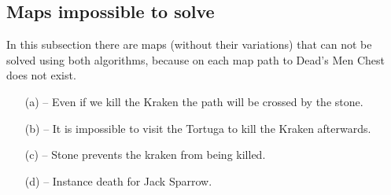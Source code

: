 \documentclass[a4paper]{article}
\begin{document}
\subsection{Maps impossible to solve}
In this subsection there are maps (without their variations) that can not be solved using both algorithms, because on each map path to Dead's Men Chest does not exist.

\begin{figure}[H]
    \centering
    \hfill %
    \hfill
    \hfill
    \hfill
\end{figure}
\begin{enumerate}
    \item [(a)] -- Even if we kill the Kraken the path will be crossed by the stone.
    \item [(b)] -- It is impossible to visit the Tortuga to kill the Kraken afterwards.
    \item [(c)] -- Stone prevents the kraken from being killed.
    \item [(d)] -- Instance death for Jack Sparrow.
\end{enumerate}
\end{document}
